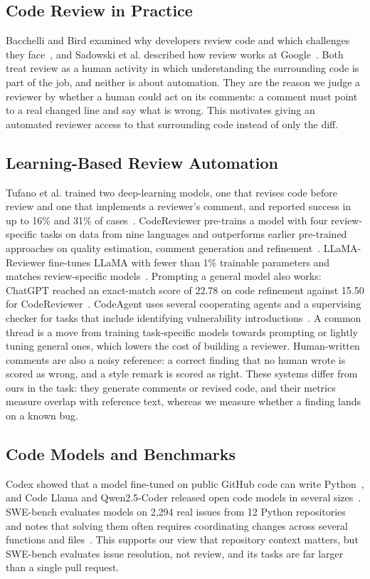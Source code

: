\documentclass[12pt,onecolumn,draftclsnofoot]{IEEEtran}
\begin{document}
\subsection{Code Review in Practice}
Bacchelli and Bird examined why developers review code and which challenges they face~\cite{bacchelli2013expectations}, and Sadowski et al. described how review works at Google~\cite{sadowski2018modern}. Both treat review as a human activity in which understanding the surrounding code is part of the job, and neither is about automation. They are the reason we judge a reviewer by whether a human could act on its comments: a comment must point to a real changed line and say what is wrong. This motivates giving an automated reviewer access to that surrounding code instead of only the diff.

\subsection{Learning-Based Review Automation}
Tufano et al. trained two deep-learning models, one that revises code before review and one that implements a reviewer's comment, and reported success in up to 16\% and 31\% of cases~\cite{tufano2021towards}. CodeReviewer pre-trains a model with four review-specific tasks on data from nine languages and outperforms earlier pre-trained approaches on quality estimation, comment generation and refinement~\cite{li2022codereviewer}. LLaMA-Reviewer fine-tunes LLaMA with fewer than 1\% trainable parameters and matches review-specific models~\cite{lu2023llamareviewer}. Prompting a general model also works: ChatGPT reached an exact-match score of 22.78 on code refinement against 15.50 for CodeReviewer~\cite{guo2023chatgpt}. CodeAgent uses several cooperating agents and a supervising checker for tasks that include identifying vulnerability introductions~\cite{tang2024codeagent}. A common thread is a move from training task-specific models towards prompting or lightly tuning general ones, which lowers the cost of building a reviewer. Human-written comments are also a noisy reference: a correct finding that no human wrote is scored as wrong, and a style remark is scored as right. These systems differ from ours in the task: they generate comments or revised code, and their metrics measure overlap with reference text, whereas we measure whether a finding lands on a known bug.

\subsection{Code Models and Benchmarks}
Codex showed that a model fine-tuned on public GitHub code can write Python~\cite{chen2021codex}, and Code Llama and Qwen2.5-Coder released open code models in several sizes~\cite{roziere2023codellama,hui2024qwen}. SWE-bench evaluates models on 2,294 real issues from 12 Python repositories and notes that solving them often requires coordinating changes across several functions and files~\cite{jimenez2024swebench}. This supports our view that repository context matters, but SWE-bench evaluates issue resolution, not review, and its tasks are far larger than a single pull request.
\end{document}
